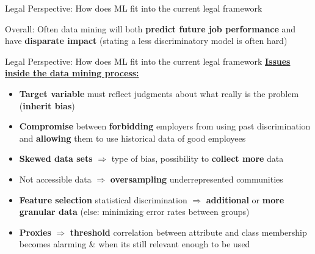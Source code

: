 {
\begin{frame}{Legal Perspective: How does ML fit into the current legal framework \cite{Barocas.2016}}
\vspace{2cm}
\begin{block}{\huge Overall:}
\LARGE Often data mining will both \textbf{predict future job performance} and have \textbf{disparate impact} (stating a less discriminatory model is often hard)
\end{block}
\end{frame}
}

\begin{frame}{Legal Perspective: How does ML fit into the current legal framework \cite{Barocas.2016}}
    \underline{\textbf{Issues inside the data mining process:}}\\
    \begin{itemize}
        \item \textbf{Target variable} must reflect judgments about what really is the problem (\textbf{inherit bias})
        \item \textbf{Compromise} between \textbf{forbidding} employers from using past discrimination and \textbf{allowing} them to use historical data of good employees
        \item \textbf{Skewed data sets} $\Rightarrow$ type of bias, possibility to \textbf{collect more} data
        \item Not accessible data $\Rightarrow$ \textbf{oversampling} underrepresented communities
        \item \textbf{Feature selection} statistical discrimination $\Rightarrow$ \textbf{additional} or \textbf{more granular data} (else: minimizing error rates between groups)
        \item \textbf{Proxies} $\Rightarrow$ \textbf{threshold} correlation between attribute and class membership becomes alarming \& when its still relevant enough to be used
    \end{itemize}
\end{frame}